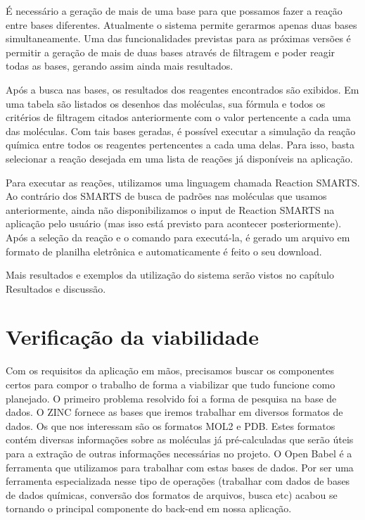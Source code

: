 \documentclass{abnt}
\begin{document}
É necessário a geração de mais de uma base para que possamos fazer a reação entre
bases diferentes. Atualmente o sistema permite gerarmos apenas duas bases simultaneamente.
Uma das funcionalidades previstas para as próximas versões é permitir a geração
de mais de duas bases através de filtragem e poder reagir todas as bases, gerando
assim ainda mais resultados.

Após a busca nas bases, os resultados dos reagentes encontrados são exibidos. Em
uma tabela são listados os desenhos das moléculas, sua fórmula e todos os critérios
de filtragem citados anteriormente com o valor pertencente a cada uma das moléculas.
Com tais bases geradas, é possível executar a simulação da reação química entre todos
os reagentes pertencentes a cada uma delas. Para isso, basta selecionar a reação
desejada em uma lista de reações já disponíveis na aplicação.

Para executar as reações, utilizamos uma linguagem chamada Reaction SMARTS. Ao contrário
dos SMARTS de busca de padrões nas moléculas que usamos anteriormente, ainda não
disponibilizamos o input de Reaction SMARTS na aplicação pelo usuário (mas isso
está previsto para acontecer posteriormente). Após a seleção da reação e o comando
para executá-la, é gerado um arquivo em formato de planilha eletrônica e automaticamente
é feito o seu download.

Mais resultados e exemplos da utilização do sistema serão vistos no capítulo Resultados
e discussão.

\section{Verificação da viabilidade}

Com os requisitos da aplicação em mãos, precisamos buscar os componentes certos
para compor o trabalho de forma a viabilizar que tudo funcione como planejado. O
primeiro problema resolvido foi a forma de pesquisa na base de dados. O ZINC fornece
as bases que iremos trabalhar em diversos formatos de dados. Os que nos interessam
são os formatos MOL2 e PDB. Estes formatos contém diversas informações sobre as
moléculas já pré-calculadas que serão úteis para a extração de outras informações
necessárias no projeto. O Open Babel é a ferramenta que utilizamos para trabalhar
com estas bases de dados. Por ser uma ferramenta especializada nesse tipo de operações
(trabalhar com dados de bases de dados químicas, conversão dos formatos de arquivos,
busca etc) acabou se tornando o principal componente do back-end em nossa aplicação.
\end{document}
